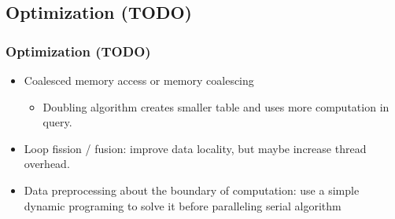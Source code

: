 \subsection{Optimization (TODO)}
\begin{frame}
	\frametitle{Optimization (TODO)}
	\begin{itemize}
		\setlength\itemsep{1em}
		\item Coalesced memory access or memory coalescing
			\begin{itemize}
				\item Doubling algorithm creates smaller table
					and uses more computation in query.
			\end{itemize}
		\item Loop fission / fusion: improve data locality, 
			but maybe increase thread overhead.
		\item Data preprocessing about the boundary of computation: use a simple dynamic programing to solve it before paralleling serial algorithm
	\end{itemize}
\end{frame}